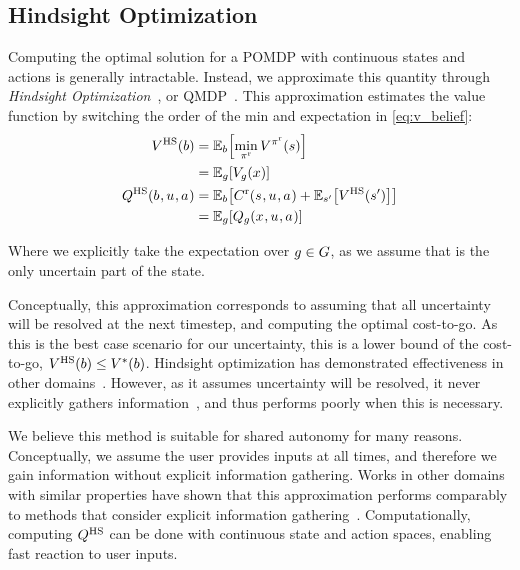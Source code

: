 \subsection{Hindsight Optimization}
\label{sec:framework_hindsight}

Computing the optimal solution for a POMDP with continuous states and actions is generally intractable. Instead, we approximate this quantity through \emph{Hindsight Optimization}~\citep{chong_2000,yoon_2008}, or QMDP~\citep{littman_1995}. This approximation estimates the value function by switching the order of the min and expectation in \cref{eq:v_belief}:
\begin{align*}
  V^{\text{HS}}(b) &= \mathbb{E}_{b}\!\left[\min_{\pi^{\text{r}}} V^{\pi^{\text{r}}}(s)\right]\\
  &= \mathbb{E}_{g}\!\left[V_{g}(x)\right]\\
  Q^{\text{HS}}(b_{ }, u_{ }, a_{ }) &= \mathbb{E}_{b}\!\left[C^{\text{r}}(s_{ }, u_{ }, a_{ }) + \mathbb{E}_{s'}\!\left[V^{\text{HS}}(s')\right]\right]\\
  &= \mathbb{E}_{g}\!\left[Q_{g}(x_{ }, u_{ }, a_{ })\right]
\end{align*}

Where we explicitly take the expectation over $g \in G$, as we assume that is the only uncertain part of the state.

Conceptually, this approximation corresponds to assuming that all uncertainty will be resolved at the next timestep, and computing the optimal cost-to-go. As this is the best case scenario for our uncertainty, this is a lower bound of the cost-to-go, $V^{\text{HS}}(b) \leq V^{*}(b)$. Hindsight optimization has demonstrated effectiveness in other domains~\citep{yoon_2007, yoon_2008}. However, as it assumes uncertainty will be resolved, it never explicitly gathers information~\citep{littman_1995}, and thus performs poorly when this is necessary.

We believe this method is suitable for shared autonomy for many reasons. Conceptually, we assume the user provides inputs at all times, and therefore we gain information without explicit information gathering. Works in other domains with similar properties have shown that this approximation performs comparably to methods that consider explicit information gathering~\citep{koval_2014}. Computationally, computing $Q^{\text{HS}}$ can be done with continuous state and action spaces, enabling fast reaction to user inputs. 


